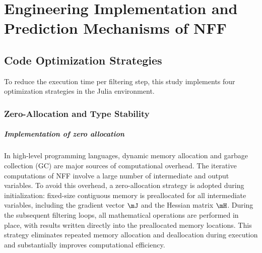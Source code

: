 \chapter{Engineering Implementation and Prediction Mechanisms of NFF}
\label{chap:implementation}

\section{Code Optimization Strategies}
\label{sec:optimization_strategies}

To reduce the execution time per filtering step, this study implements four optimization strategies in the Julia environment\cite{JULIA}.

\subsection{Zero-Allocation and Type Stability}
\label{subsec:zero_allocation}

\paragraph{Implementation of zero allocation} In high-level programming languages, dynamic memory allocation and garbage collection (GC) are major sources of computational overhead. The iterative computations of NFF involve a large number of intermediate and output variables. To avoid this overhead, a zero-allocation strategy is adopted during initialization: fixed-size contiguous memory is preallocated for all intermediate variables, including the gradient vector $\mJ$ and the Hessian matrix $\mH$. During the subsequent filtering loops, all mathematical operations are performed in place, with results written directly into the preallocated memory locations. This strategy eliminates repeated memory allocation and deallocation during execution and substantially improves computational efficiency.

